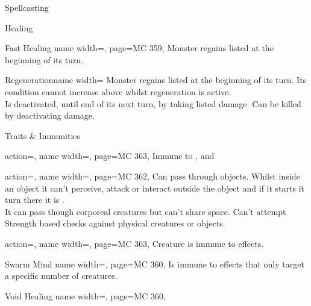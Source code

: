 \begin{PageFront}
\begin{Table}{Spellcasting}
    \end{Table}
    \begin{Table}{Healing}
        \begin{entry}{Fast Healing}{%
            name width=\monsterLength,
            page=MC 359,%
        }
            Monster regains listed \HPs at the beginning of its turn.
        \end{entry}
        \begin{entry}{Regeneration}{name width=\monsterLength}
            Monster regains listed \HPs at the beginning of its turn. \hfill Its \Dying condition cannot increase above  whilst regeneration is active.\\
        Is deactivated, until end of its next turn, by taking listed damage. \hfill Can be killed by deactivating damage.
        \end{entry}
    \end{Table}
    \begin{Table}{Traits \& Immunities}
        \begin{entry}{}{%
            action=,
            name width=\monsterLength,
            page=MC 363,%
        }
            Immune to \Grabbed, \Prone and \Restrained
        \end{entry}
        \begin{entry}{}{%
            action=,
            name width=\monsterLength,
            page=MC 362,%
        }
            Can pass through objects. Whilst inside an object it can't perceive, attack or interact outside the object and if it starts it turn there it is \Slowed {}.\\
            It can pass though corporeal creatures but can't share space. \hfill Can't attempt Strength based checks against physical creatures or objects.
        \end{entry}
        \begin{entry}{}{%
            action=,%
            name width=\monsterLength,%
            page=MC 363,%
        }
            Creature is immune to \Mental effects.
        \end{entry}
        \begin{entry}{Swarm Mind}{%
            name width=\monsterLength,
            page=MC 360,%
        }
            Is immune to \Mental effects that only target a specific number of creatures.
        \end{entry}
        \begin{entry}{Void Healing}{%
            name width=\monsterLength,
            page=MC 360,%
        }

\end{entry}
\end{Table}
\end{PageFront}
